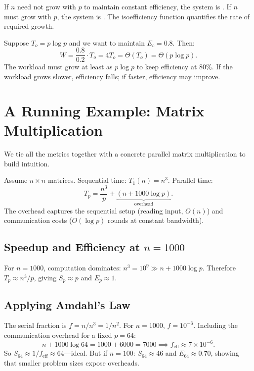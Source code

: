 \begin{ppnote}
If $n$ need not grow with $p$ to maintain constant efficiency, the system is
. If $n$ must grow with $p$, the system is
. The isoefficiency function quantifies the rate of
required growth.
\end{ppnote}

\begin{ppexample}
Suppose $T_o = p \log p$ and we want to maintain $E_c = 0.8$. Then:
\[
  W = \frac{0.8}{0.2} \cdot T_o = 4 T_o = \Theta(T_o) = \Theta(p \log p).
\]
The workload must grow at least as $p \log p$ to keep efficiency at 80\%.
If the workload grows slower, efficiency falls; if faster, efficiency may
improve.
\end{ppexample}

\section{A Running Example: Matrix Multiplication}

We tie all the metrics together with a concrete parallel matrix multiplication
to build intuition.

Assume $n \times n$ matrices. Sequential time: $T_1(n) = n^3$. Parallel time:
\[
  T_p = \frac{n^3}{p} + \underbrace{(n + 1000 \log p)}_{\text{overhead}}.
\]
The overhead captures the sequential setup (reading input, $O(n)$) and
communication costs ($O(\log p)$ rounds at constant bandwidth).

\subsection{Speedup and Efficiency at $n = 1000$}

For $n = 1000$, computation dominates: $n^3 = 10^9 \gg n + 1000 \log p$.
Therefore $T_p \approx n^3/p$, giving $S_p \approx p$ and $E_p \approx 1$.

\subsection{Applying Amdahl's Law}

The serial fraction is $f = n / n^3 = 1/n^2$. For $n = 1000$, $f = 10^{-6}$.
Including the communication overhead for a fixed $p = 64$:
\[
  n + 1000 \log 64 = 1000 + 6000 = 7000 \implies f_{\text{eff}} \approx 7 \times 10^{-6}.
\]
So $S_{64} \approx 1/f_{\text{eff}} \approx 64$---ideal. But if $n = 100$:
$S_{64} \approx 46$ and $E_{64} \approx 0.70$, showing that smaller problem
sizes expose overheads.

